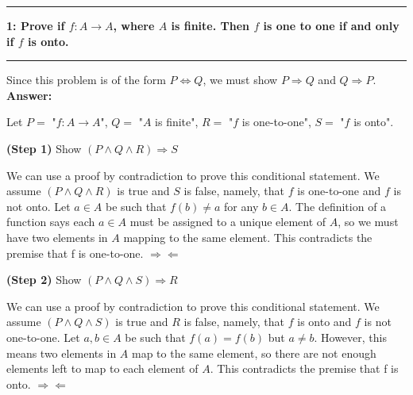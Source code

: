 \documentclass[11pt]{article}
\newcommand\question[2]{\vspace{.25in}\hrule\textbf{#1: #2}\vspace{.5em}\hrule\vspace{.10in}}
\renewcommand\part[1]{\vspace{.10in}\textbf{(#1)}}
\newcommand\answer{\vspace{.10in}\textbf{Answer: }}
\begin{document}
\raggedright
\newcommand\NAME{Stewart Dulaney}  %
\newcommand\SID{1545566}     %
\newcommand\HWNUM{4}              %

\question{1}{Prove if $f: A \rightarrow A$, where $A$ is finite. Then $f$ is one to one if and only if $f$ is onto.} 

Since this problem is of the form $P \Leftrightarrow Q$, we must show $P \Rightarrow Q$ and $Q \Rightarrow P$.\\[\baselineskip]

\answer

Let $P =$ "$f: A \rightarrow A$", $Q =$ "$A$ is finite", $R =$ "$f$ is one-to-one", $S  =$ "$f$ is onto".

\part{Step 1} Show $(P \land Q \land R) \Rightarrow S$

We can use a proof by contradiction to prove this conditional statement. We assume $(P \land Q \land R)$ is true and $S$ is false, namely, that $f$ is one-to-one and $f$ is not onto. Let $a \in A$ be such that $f(b) \neq a$ for any $b \in A$. The definition of a function says each $a \in A$ must be assigned to a unique element of $A$, so we must have two elements in $A$ mapping to the same element. This contradicts the premise that f is one-to-one. $\Rightarrow\!\Leftarrow$

\part{Step 2} Show $(P \land Q \land S) \Rightarrow R$

We can use a proof by contradiction to prove this conditional statement. We assume $(P \land Q \land S)$ is true and $R$ is false, namely, that $f$ is onto and $f$ is not one-to-one. Let $a, b \in A$ be such that $f(a) = f(b)$ but $a \neq b$. However, this means two elements in $A$ map to the same element, so there are not enough elements left to map to each element of $A$. This contradicts the premise that f is onto. $\Rightarrow\!\Leftarrow$
\end{document}
